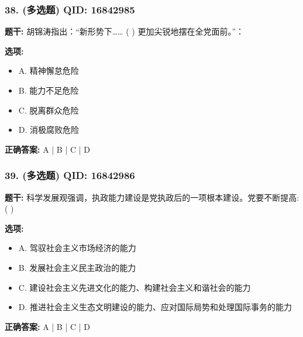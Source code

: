 \documentclass[12pt,UTF8]{ctexart}
\begin{document}
\subsubsection*{38. (多选题) \small QID: 16842985}

\textbf{题干:}
胡锦涛指出：“新形势下……  ( ) 更加尖锐地摆在全党面前。”：

\textbf{选项:}
\begin{itemize}[leftmargin=*]

  \item A. 精神懈怠危险

  \item B. 能力不足危险

  \item C. 脱离群众危险

  \item D. 消极腐败危险

\end{itemize}

\textbf{正确答案:}
A | B | C | D

\vspace{0.3em}\hrulefill\vspace{0.7em}

\subsubsection*{39. (多选题) \small QID: 16842986}

\textbf{题干:}
科学发展观强调，执政能力建设是党执政后的一项根本建设。党要不断提高: ( )

\textbf{选项:}
\begin{itemize}[leftmargin=*]

  \item A. 驾驭社会主义市场经济的能力

  \item B. 发展社会主义民主政治的能力

  \item C. 建设社会主义先进文化的能力、构建社会主义和谐社会的能力

  \item D. 推进社会主义生态文明建设的能力、应对国际局势和处理国际事务的能力

\end{itemize}

\textbf{正确答案:}
A | B | C | D

\vspace{0.3em}\hrulefill\vspace{0.7em}
\end{document}
